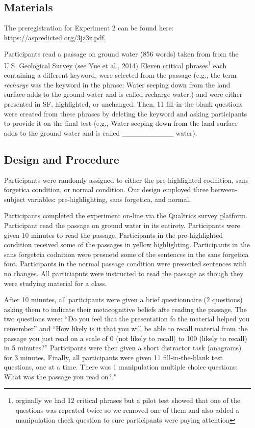 \documentclass[pdf]{apa6}
\begin{document}
\hypertarget{materials-1}{%
\subsection{Materials}\label{materials-1}}

The preregistration for Experiment 2 can be found here: \url{https://aspredicted.org/3jz3z.pdf}.

Participants read a passage on ground water (856 words) taken from from the U.S. Geological Survey (see Yue et al., 2014) Eleven critical phrases\footnote{orginally we had 12 critical phrases but a pilot test showed that one of the questions was repeated twice so we removed one of them and also added a manipulation check question to sure participants were paying attention} each containing a different keyword, were selected from the passage (e.g., the term \emph{recharge} was the keyword in the phrase: Water seeping down from the land surface adds to the ground water and is called recharge water.) and were either presented in SF, highlighted, or unchanged. Then, 11 fill-in-the blank questions were created from these phrases by deleting the keyword and asking participants to provide it on the final test (e.g., Water seeping down from the land surface adds to the ground water and is called \_\_\_\_\_\_\_\_\_\_ water).

\hypertarget{design-and-procedure-1}{%
\subsection{Design and Procedure}\label{design-and-procedure-1}}

Participants were randomly assigned to either the pre-highlighted codnition, sans forgetica condition, or normal condition. Our design employed three between-subject variables: pre-highlighting, sans forgetica, and normal.

Participants completed the experiment on-line via the Qualtrics survey platform. Participant read the passage on ground water in its entirety. Participants were given 10 minutes to read the passage. Participants in the pre-highlighted condition received some of the passages in yellow highlighting. Participants in the sans forgetcia codnition were presnetd some of the sentences in the sans forgetica font. Participants in the normal passage condition were presented sentences with no changes. All particiapnts were instructed to read the passage as though they were studying material for a class.

After 10 minutes, all participants were given a brief questionnaire (2 questions) asking them to indicate their metacognitive beliefs afte reading the passage. The two questions were: \enquote{Do you feel that the presentation fo the material helped you remember} and \enquote{How likely is it that you will be able to recall material from the passage you just read on a scale of 0 (not likely to recall) to 100 (likely to recall) in 5 minutes?} Participants were then given a short distractor task (anagrams) for 3 minutes. Finally, all participants were given 11 fill-in-the-blank test questions, one at a time. There was 1 manipulation multiple choice questions: What was the passage you read on?."
\end{document}
